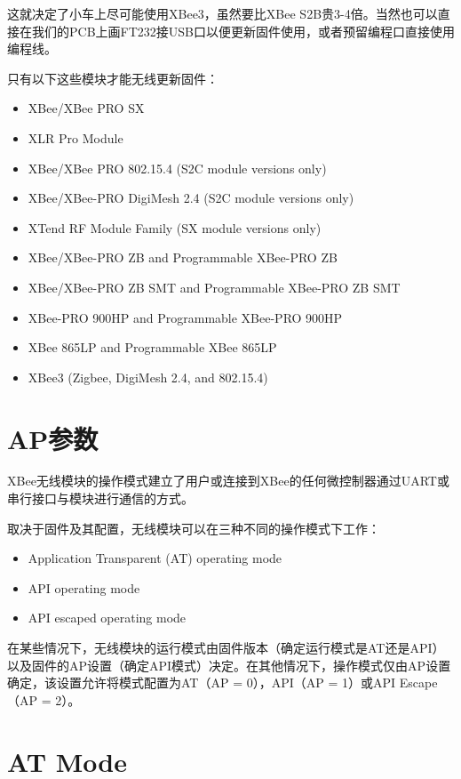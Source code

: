 这就决定了小车上尽可能使用XBee3，虽然要比XBee S2B贵3-4倍。当然也可以直接在我们的PCB上画FT232接USB口以便更新固件使用，或者预留编程口直接使用编程线。

只有以下这些模块才能无线更新固件：

\begin{itemize}
    \item XBee/XBee PRO SX
    \item XLR Pro Module
    \item XBee/XBee PRO 802.15.4 (S2C module versions only)
    \item XBee/XBee-PRO DigiMesh 2.4 (S2C module versions only)
    \item XTend RF Module Family (SX module versions only)
    \item XBee/XBee-PRO ZB and Programmable XBee-PRO ZB
    \item XBee/XBee-PRO ZB SMT and Programmable XBee-PRO ZB SMT
    \item XBee-PRO 900HP and Programmable XBee-PRO 900HP
    \item XBee 865LP and Programmable XBee 865LP
    \item XBee3 (Zigbee, DigiMesh 2.4, and 802.15.4)
\end{itemize}

\section{AP参数}

XBee无线模块的操作模式建立了用户或连接到XBee的任何微控制器通过UART或串行接口与模块进行通信的方式。

取决于固件及其配置，无线模块可以在三种不同的操作模式下工作：

\begin{itemize}
    \item Application Transparent (AT) operating mode
    \item API operating mode
    \item API escaped operating mode
\end{itemize}

在某些情况下，无线模块的运行模式由固件版本（确定运行模式是AT还是API）以及固件的AP设置（确定API模式）决定。在其他情况下，操作模式仅由AP设置确定，该设置允许将模式配置为AT（AP = 0），API（AP = 1）或API Escape（AP = 2）。

\section{AT Mode}

